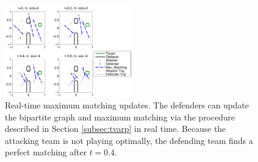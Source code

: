\begin{figure}[h]
\centering
\includegraphics[width=0.5\textwidth]{"fig/time varying graph"}
\caption{Real-time maximum matching updates. The defenders can update the bipartite graph and maximum matching via the procedure described in Section \ref{subsec:tvarp} in real time. Because the attacking team is not playing optimally, the defending team finds a perfect matching after $t=0.4$.}
\label{fig:tvarg}
\end{figure}